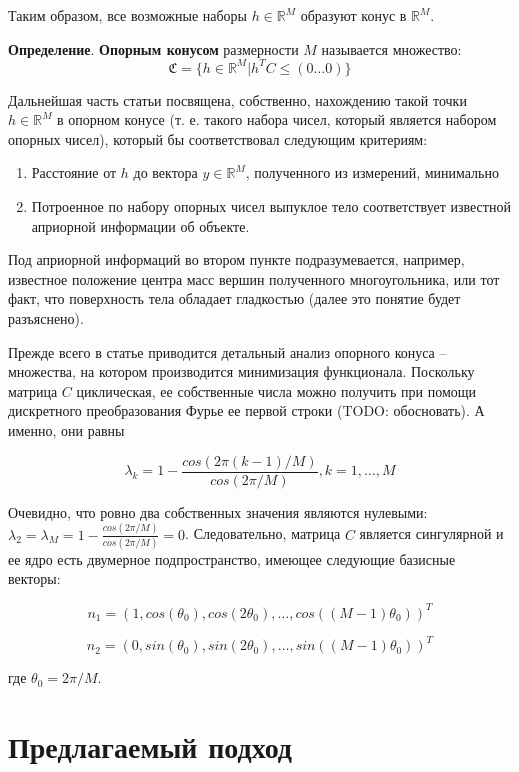 \documentclass[a4paper,12pt, titlepage]{article}
\begin{document}
Таким образом, все возможные наборы $h \in \mathbb{R}^{M}$ образуют конус в
$\mathbb{R}^{M}$.

\begin{flushleft}
 \textbf{Определение}. \textbf{Опорным конусом} размерности $M$ называется
 множество:
 $$
 \mathfrak{C} = \{h \in \mathbb{R}^{M} | h^{T} C \leq (0 \ldots 0) \}
 $$
\end{flushleft}

Дальнейшая часть статьи посвящена, собственно, нахождению такой точки 
$h \in \mathbb{R}^{M}$ в
опорном конусе (т. е. такого набора чисел, который является набором опорных
чисел), который бы соответствовал следующим критериям:

\begin{enumerate}
 \item Расстояние от $h$ до вектора $y \in \mathbb{R}^{M}$, полученного из
измерений, минимально
 \item Потроенное по набору опорных чисел выпуклое тело соответствует
известной априорной информации об объекте.
\end{enumerate}

Под априорной информаций во втором пункте подразумевается, например, известное
положение центра масс вершин полученного многоугольника, или тот факт, что
поверхность тела обладает гладкостью (далее это понятие будет разъяснено).

Прежде всего в статье приводится детальный анализ опорного конуса -- множества,
на котором производится минимизация функционала. Поскольку матрица $C$
циклическая, ее собственные числа можно получить при помощи дискретного
преобразования Фурье ее первой строки (TODO: обосновать). А именно, они равны

$$
\lambda_{k} = 1 - \frac{cos(2 \pi (k - 1) / M)}{cos(2 \pi / M)},
k = 1, \ldots, M
$$

Очевидно, что ровно два собственных значения являются нулевыми:
$\lambda_{2} = \lambda_{M} = 1 - \frac{cos(2 \pi / M)}{cos(2 \pi / M)} = 0$.
Следовательно, матрица $C$ является сингулярной и ее ядро есть двумерное
подпространство, имеющее следующие базисные векторы:

$$
n_{1} = (1, cos(\theta_{0}), cos(2 \theta_{0}), \ldots,
cos((M - 1) \theta_{0}))^{T}
$$

$$
n_{2} = (0, sin(\theta_{0}), sin(2 \theta_{0}), \ldots,
sin((M - 1) \theta_{0}))^{T}
$$

где $\theta_{0} = 2 \pi / M$.	


\section{Предлагаемый подход}

\newpage


\end{document}
